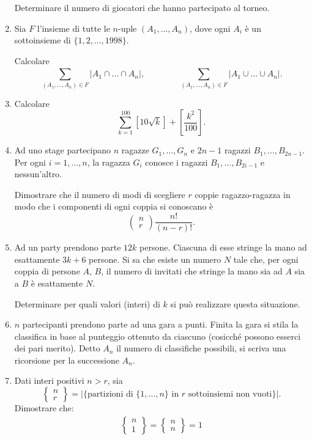 \documentclass[a4paper,10pt]{article}
\newcommand{\Stirling}[2]
{
	\left\{\!
	\begin{array}{c}
		#1\\
		#2
	\end{array}
	\!\right\}
}
\begin{document}
\begin{enumerate}
	Determinare il numero di giocatori che hanno partecipato al torneo.

	\item  Sia $F$ l'insieme di tutte le $n$-uple $(A_{1},\ldots,A_{n})$,
	dove ogni $A_{i}$ \`{e} un sottoinsieme di $\{1,2,\ldots,1998\}$.

	Calcolare
	$$\sum_{(A_{1},\ldots,A_{n})\in F}^{}\left|
	A_{1}\cap\ldots\cap A_{n}\right|,
	\hspace{4em}
	\sum_{(A_{1},\ldots,A_{n})\in F}^{}\left|
	A_{1}\cup\ldots\cup A_{n}\right|.$$

	\item  Calcolare
	$$\sum_{k=1}^{100}\left[10\sqrt{k}\right]+
	\left[\frac{k^{2}}{100}\right].$$

	\item Ad uno stage partecipano $n$ ragazze $G_{1},\ldots,G_{n}$ e
	$2n-1$ ragazzi $B_{1},\ldots,B_{2n-1}$.  Per ogni $i=1,\ldots,n$,
	la ragazza $G_{i}$ conosce i ragazzi $B_{1},\ldots,B_{2i-1}$ e
	nessun'altro.

	Dimostrare che il numero di modi di scegliere $r$ coppie
	ragazzo-ragazza in modo che i componenti di ogni coppia si
	conoscano \`{e}
	$$\left(\!
	\begin{array}{c}
		n  \\
		r
	\end{array}\!
	\right)\frac{n!}{(n-r)!}.$$

	\item  Ad un party prendono parte $12k$ persone. Ciascuna di esse
	stringe la mano ad esattamente $3k+6$ persone. Si sa che esiste un
	numero $N$ tale che, per ogni coppia di persone $A$, $B$, il numero
	di invitati che stringe la mano sia ad $A$ sia a $B$ \`{e}
	esattamente $N$.

	Determinare per quali valori (interi) di $k$ si pu\`{o} realizzare
	questa situazione.

	\item $n$ partecipanti prendono parte ad una gara a punti. Finita la
	gara si stila la classifica in base al punteggio ottenuto da ciascuno
	(cosicch\'e possono esserci dei pari merito). Detto $A_n$ il numero di
	classifiche possibili, si scriva una ricorsione per la successione $A_n$.
	
	\item Dati interi positivi $n > r$, sia
	$$ \Stirling n r =
	|\{\text{partizioni di } \{1,\dots,n\} \text{ in } r \text{ sottoinsiemi non vuoti}\}|.$$
	Dimostrare che:
	\begin{eqnarray*}
		\Stirling n 1 = \Stirling n n = 1\\
		

\end{eqnarray*}
\end{enumerate}
\end{document}
